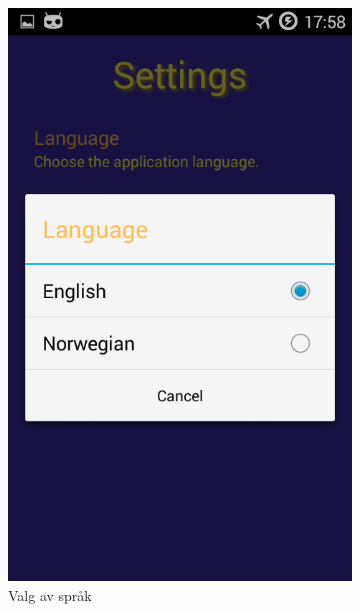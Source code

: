\begin{figure}[ht]
\begin{subfigure}[b]{0.25\textwidth}
        \includegraphics[width=\textwidth]{./img/bruksanvisning/8.png}
        \caption{Valg av språk}
        \label{fig:innstllinger_velg_sprak}
    \end{subfigure}
    \begin{subfigure}[b]{0.25\textwidth}

\end{subfigure}
\end{figure}
